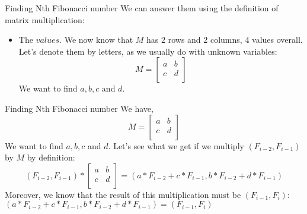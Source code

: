 \documentclass{beamer}
\begin{document}
\begin{frame}{Finding Nth Fibonacci number}
  We can answer them using the definition of matrix multiplication: \newline
  \begin{itemize}
    \item The $values$. \newline
      We now know that $M$ has $2$ rows and $2$ columns, $4$ values overall.
      Let’s denote them by letters, as we usually do with unknown variables:
      \newline \newline
        \[
          M = 
          \left[ {
            \begin{array}{cc}
              a & b \\
              c & d \\      
            \end{array} } 
          \right]
        \]
      We want to find $a, b, c$ and $d$.
      \newline
  \end{itemize}
\end{frame}

\begin{frame}{Finding Nth Fibonacci number}
  We have, 
  \[
    M = 
    \left[ {
      \begin{array}{cc}
        a & b \\
        c & d \\      
      \end{array} } 
    \right]
  \]
  We want to find $a, b, c$ and $d$.
  \newline
  Let's see what we get if we multiply $(F_{i-2}, F_{i-1})$ by $M$ by definition:  
  \newline
  \[
    (F_{i-2}, F_{i-1})
    *
    \left[ {
      \begin{array}{cc}
        a & b \\
        c & d \\      
      \end{array} } 
    \right]
    =
    (a * F_{i-2} + c * F_{i-1}, b * F_{i-2} + d * F_{i-1})
  \]
  Moreover, we know that the result of this multiplication must be $(F_{i-1}, F_i)$:
  \newline
  $(a * F_{i-2} + c * F_{i-1}, b * F_{i-2} + d * F_{i-1}) = (F_{i-1}, F_i)$
\end{frame}
\end{document}
